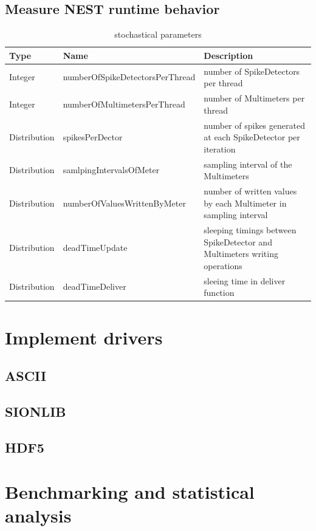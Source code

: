 \documentclass[]{YIC2015}
\begin{document}
\subsection{Measure NEST runtime behavior}

\begin{table}[htdp]
\caption{stochastical parameters}
\centering
\begin{tabular}{lll}
\hline\hline
\textbf{Type} & \textbf{Name} & \textbf{Description} \\ \hline
Integer &   numberOfSpikeDetectorsPerThread & number of SpikeDetectors per thread  \\
Integer &   numberOfMultimetersPerThread & number of Multimeters per thread  \\
Distribution &   spikesPerDector & number of spikes generated at each SpikeDetector per iteration  \\
Distribution &   samlpingIntervalsOfMeter & sampling interval of the Multimeters  \\
Distribution &   numberOfValuesWrittenByMeter & number of written values by each Multimeter in sampling interval  \\
Distribution  &  deadTimeUpdate & sleeping timings between SpikeDetector and Multimeters writing operations \\
Distribution &   deadTimeDeliver & sleeing time in deliver function  \\
\hline\hline
\end{tabular}
\label{tab:table-silva1}
\end{table}

\section{Implement drivers}
\subsection{ASCII}
\subsection{SIONLIB}
\subsection{HDF5}
\section{Benchmarking and statistical analysis}
\end{document}
